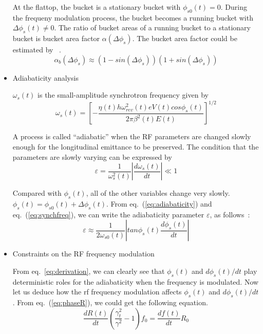 \begin{itemize}
At the flattop, the bucket is a stationary bucket with $\phi_{s0}(t)=0$. During the frequeny modulation process, the bucket becomes a running bucket with $\Delta\phi_s(t)\ne0$. The ratio of bucket areas of a running bucket to a stationary bucket is bucket area factor $\alpha(\Delta \phi_s)$. 
The bucket area factor could be estimated by ~\cite{lee_accelerator_2011}.
\begin{equation}
\alpha_b(\Delta\phi_s)\approx(1-sin(\Delta \phi_s))(1+sin(\Delta \phi_s))
\label{eq:buckt_area_factor}
\end{equation} 

\item Adiabaticity analysis

$\omega_s(t)$ is the small-amplitude synchrotron frequency given by
\begin{equation}
\omega_s(t) =[{-\frac{\eta(t)h\omega_{rev}^2(t)eV(t)cos{\phi_s(t)}}{2\pi\beta^2(t)E(t)}}]^{1/2}
\label{eq:synchfreq}
\end{equation} 

A process is called “adiabatic” when the RF parameters are changed slowly enough for the longitudinal emittance to be preserved. The condition that the parameters are slowly varying can be expressed by
\begin{equation}
\varepsilon=\frac{1}{\omega_s^2(t)}|\frac{d\omega_s(t)}{dt}| \ll 1
\label{eq:adiabaticity}
\end{equation} 

Compared with $\phi_s(t)$, all of the other variables change very slowly. $\phi_s(t)=\phi_{s0}(t)+\Delta\phi_s(t)$. From eq.~(\ref{eq:adiabaticity}) and eq.~(\ref{eq:synchfreq}), we can write the adiabaticity parameter $\varepsilon$, as follows~\cite{ezura_beam-dynamics_2008}:
\begin{equation}
\varepsilon \approx \frac{1}{2\omega_{s0}(t)}|tan\phi_{s}(t)\frac{d\phi_s(t)}{dt}|
\label{eq:derivation}
\end{equation} 

\item Constraints on the RF frequency modulation

From eq.~\ref{eq:derivation}, we can clearly see that $\phi_s(t)$ and $d\phi_s(t)/dt$ play deterministic roles for the adiabaticity when the frequency is modulated. Now let us deduce how the rf frequency modulation affects $\phi_s(t)$ and $d\phi_s(t)/dt$. From eq.~(\ref{eq:phaseR}), we could get the following equation.
\begin{equation}
\frac{dR(t)}{dt}(\frac{\gamma_t^2}{\gamma^2}-1)f_0=\frac{df(t)}{dt} R_0
\label{eq:RtoF}
\end{equation}



\end{itemize}
